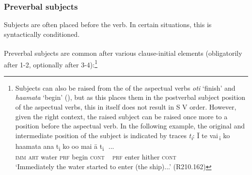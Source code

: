 \subsubsection[Preverbal subjects]{Preverbal subjects}\label{sec:8.6.1.1}
Subjects are often placed before the verb. In certain situations, this is syntactically conditioned. 

\paragraph{}\label{sec:8.6.1.1.1} Preverbal subjects are common after various clause-initial elements (obligatorily after 1-2, optionally after 3-4):\footnote{\label{fn:419}Subjects can also be raised from the  of the aspectual verbs \textit{oti} ‘finish’ and \textit{\mbox{ha{\ꞌ}amata}} ‘begin’ (), but as this places them in the postverbal subject position of the aspectual verbs, this in itself does not result in S V order. However, given the right context, the raised subject can be raised once more to a position before the aspectual verb. In the following example, the original and intermediate position of the subject is indicated by traces \textit{\textup{t}}\textit{\textsubscript{i}}:
\ea \gll
{\ꞌ}Ī {\ob}te vai\,{\cb}\textsubscript{\textup{i}} {\ob}ko ha{\ꞌ}amata {\ꞌ}ana \textup{t\textsubscript{i}} {\ob}ko o{\ꞌ}o mai {\ꞌ}ā \textup{t\textsubscript{i}} \,{\cb}\,{\cb}...\\
  \textsc{imm} {\db}\textsc{art} water {\db}\textsc{prf} begin \textsc{cont} ~ {\db}\textsc{prf} enter hither \textsc{cont}\\
  \glt 
  ‘Immediately the water started to enter (the ship)...’ (R210.162)\z }

